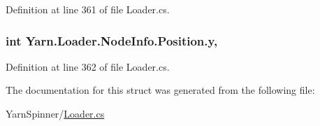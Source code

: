 Definition at line 361 of file Loader.\-cs.

\hypertarget{a00151_a390d560bd9faa3a32d8a0489c69be9e0}{
\subsubsection[{y}]{\setlength{\rightskip}{0pt plus 5cm}int Yarn.\-Loader.\-Node\-Info.\-Position.\-y\hspace{0.3cm}{\ttfamily [get]}, {\ttfamily [set]}}}\label{a00151_a390d560bd9faa3a32d8a0489c69be9e0}


Definition at line 362 of file Loader.\-cs.



The documentation for this struct was generated from the following file\-:\begin{DoxyCompactItemize}
\item 
Yarn\-Spinner/\hyperlink{a00312}{Loader.\-cs}\end{DoxyCompactItemize}
